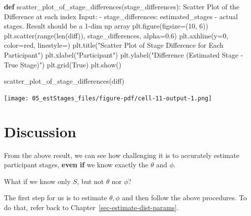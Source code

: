 \documentclass[
  letterpaper,
  DIV=11,
  numbers=noendperiod]{scrreprt}
\newenvironment{Shaded}{\begin{snugshade}}{\end{snugshade}}
\newcommand{\BuiltInTok}[1]{\textcolor[rgb]{0.00,0.23,0.31}{#1}}
\newcommand{\CommentTok}[1]{\textcolor[rgb]{0.37,0.37,0.37}{#1}}
\newcommand{\DecValTok}[1]{\textcolor[rgb]{0.68,0.00,0.00}{#1}}
\newcommand{\FloatTok}[1]{\textcolor[rgb]{0.68,0.00,0.00}{#1}}
\newcommand{\KeywordTok}[1]{\textcolor[rgb]{0.00,0.23,0.31}{\textbf{#1}}}
\newcommand{\NormalTok}[1]{\textcolor[rgb]{0.00,0.23,0.31}{#1}}
\newcommand{\OperatorTok}[1]{\textcolor[rgb]{0.37,0.37,0.37}{#1}}
\newcommand{\StringTok}[1]{\textcolor[rgb]{0.13,0.47,0.30}{#1}}
\newcommand{\VariableTok}[1]{\textcolor[rgb]{0.07,0.07,0.07}{#1}}
\begin{document}
\begin{Shaded}
\begin{Highlighting}[]
\KeywordTok{def}\NormalTok{ scatter\_plot\_of\_stage\_differences(stage\_differences):}
    \CommentTok{\textquotesingle{}\textquotesingle{}\textquotesingle{}Scatter Plot of the Difference at each index}
\CommentTok{    Input:}
\CommentTok{    {-} stage\_differences: estimated\_stages {-} actual stages. Result should be a 1{-}dim np array}
\CommentTok{    \textquotesingle{}\textquotesingle{}\textquotesingle{}}
\NormalTok{    plt.figure(figsize}\OperatorTok{=}\NormalTok{(}\DecValTok{10}\NormalTok{, }\DecValTok{6}\NormalTok{))}
\NormalTok{    plt.scatter(}\BuiltInTok{range}\NormalTok{(}\BuiltInTok{len}\NormalTok{(diff)), stage\_differences, alpha}\OperatorTok{=}\FloatTok{0.6}\NormalTok{)}
\NormalTok{    plt.axhline(y}\OperatorTok{=}\DecValTok{0}\NormalTok{, color}\OperatorTok{=}\StringTok{\textquotesingle{}red\textquotesingle{}}\NormalTok{, linestyle}\OperatorTok{=}\StringTok{\textquotesingle{}{-}{-}\textquotesingle{}}\NormalTok{)}
\NormalTok{    plt.title(}\StringTok{"Scatter Plot of Stage Difference for Each Participant"}\NormalTok{)}
\NormalTok{    plt.xlabel(}\StringTok{"Participant"}\NormalTok{)}
\NormalTok{    plt.ylabel(}\StringTok{"Difference (Estimated Stage {-} True Stage)"}\NormalTok{)}
\NormalTok{    plt.grid(}\VariableTok{True}\NormalTok{)}
\NormalTok{    plt.show()}
\end{Highlighting}
\end{Shaded}

\begin{Shaded}
\begin{Highlighting}[]
\NormalTok{scatter\_plot\_of\_stage\_differences(diff)}
\end{Highlighting}
\end{Shaded}

\texttt{[image: 05\_estStages\_files/figure-pdf/cell-11-output-1.png]}

\section{Discussion}\label{discussion}

From the above result, we can see how challenging it is to accurately
estimate participant stages, \textbf{even if} we know exactly the
\(\theta\) and \(\phi\).

\begin{tcolorbox}[enhanced jigsaw, breakable, bottomtitle=1mm, toprule=.15mm, colframe=quarto-callout-tip-color-frame, colbacktitle=quarto-callout-tip-color!10!white, arc=.35mm, bottomrule=.15mm, left=2mm, opacitybacktitle=0.6, toptitle=1mm, colback=white, opacityback=0, title=\textcolor{quarto-callout-tip-color}{\faLightbulb}\hspace{0.5em}{Tip}, titlerule=0mm, rightrule=.15mm, leftrule=.75mm, coltitle=black]

What if we know only \(S\), but not \(\theta\) nor \(\phi\)?

The first step for us is to estimate \(\theta, \phi\) and then follow
the above procedures. To do that, refer back to
Chapter~\ref{sec-estimate-dist-params}.

\end{tcolorbox}
\end{document}

